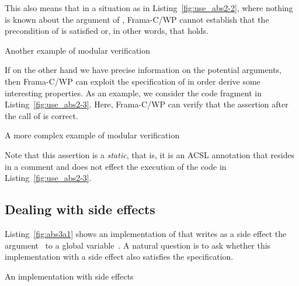 This also means that in a situation as in Listing~\ref{fig:use_abs2-2},
where nothing is known about the argument of , 
Frama-C\slash WP cannot establish that the precondition of  is satisfied
or, in other words, that  holds.

\begin{listing}[hbt]
\begin{minipage}{\textwidth}

\end{minipage}
\caption{\label{fig:use_abs2-2} Another example of modular verification}
\end{listing}

\clearpage

If on the other hand we have precise information on the potential
arguments, then Frama-C\slash WP can exploit the specification of 
 in order derive some interesting properties.
As an example, we consider the code fragment in Listing~\ref{fig:use_abs2-3}.
Here, Frama-C\slash WP can verify that the assertion after 
the call of  is correct.


\begin{listing}[hbt]
\begin{minipage}{\textwidth}

\end{minipage}
\caption{\label{fig:use_abs2-3} A more complex example of modular verification}
\end{listing}

Note that this assertion is a \emph{static}, that is, it is
an ACSL annotation that resides in a comment and does not effect
the execution of the code in Listing~\ref{fig:use_abs2-3}.

\clearpage

\subsection{Dealing with side effects}

Listing~\ref{fig:abs3a1} shows an implementation of 
that writes as a side effect the argument~ to a global variable~.
A natural question is to ask whether this implementation with a side effect
also satisfies the specification.

\begin{listing}[hbt]
\begin{minipage}{\textwidth}

\end{minipage}
\caption{\label{fig:abs3a1} An implementation with side effects}
\end{listing}

